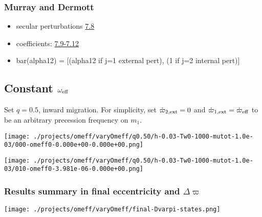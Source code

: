 \documentclass[11pt]{article}
\begin{document}
\subsubsection{Murray and Dermott}
\label{sec:org11be515}
\begin{itemize}
\item secular perturbations \href{./images/screenshot-02.png}{7.8}
\item coefficients: \href{./images/screenshot-03.png}{7.9-7.12}
\item bar(alpha12) = [(alpha12 if j=1 external pert),  (1 if j=2 internal pert)]
\end{itemize}

\subsection{Constant \(\omega_{\rm eff}\)}
\label{sec:org4d3d6d1}
Set \(q=0.5\), inward migration. For simplicity, set \(\dot\varpi_{2,\rm
ext} = 0\) and \(\dot\varpi_{1,\rm ext}=\dot\varpi_{\rm eff}\) to be an
arbitrary precession frequency on \(m_1\).

\begin{center}
\texttt{[image: ./projects/omeff/varyOmeff/q0.50/h-0.03-Tw0-1000-mutot-1.0e-03/000-omeff0-0.000e+00-0.000e+00.png]}
\end{center}

\begin{center}
\texttt{[image: ./projects/omeff/varyOmeff/q0.50/h-0.03-Tw0-1000-mutot-1.0e-03/010-omeff0-3.981e-06-0.000e+00.png]}
\end{center}

\subsubsection{Results summary in final eccentricity and \(\Delta\varpi\)}
\label{sec:org3bb670d}
\begin{center}
\texttt{[image: ./projects/omeff/varyOmeff/final-Dvarpi-states.png]}
\end{center}
\end{document}
